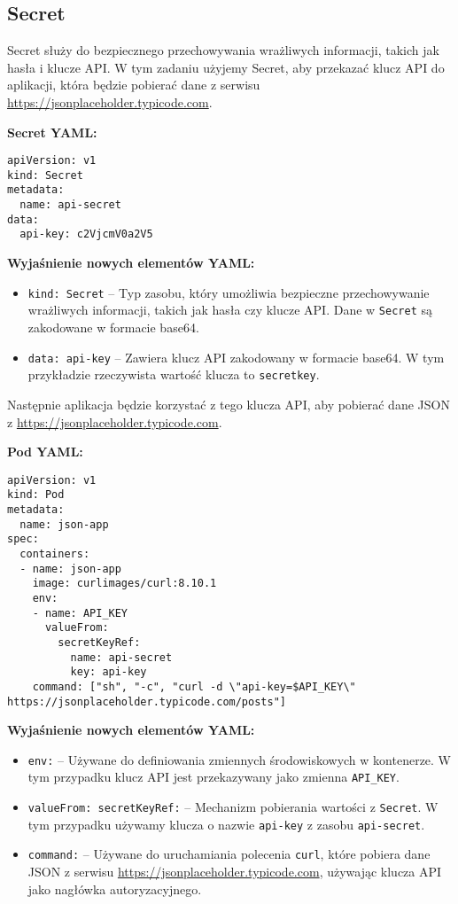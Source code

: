\documentclass{article}
\begin{document}
\subsection{Secret}

Secret służy do bezpiecznego przechowywania wrażliwych informacji, takich jak hasła i klucze API. W tym zadaniu użyjemy Secret, aby przekazać klucz API do aplikacji, która będzie pobierać dane z serwisu \url{https://jsonplaceholder.typicode.com}.

\textbf{Secret YAML:}
\begin{lstlisting}
apiVersion: v1
kind: Secret
metadata:
  name: api-secret
data:
  api-key: c2VjcmV0a2V5
\end{lstlisting}

\textbf{Wyjaśnienie nowych elementów YAML:}
\begin{itemize}
  \item \texttt{kind: Secret} – Typ zasobu, który umożliwia bezpieczne przechowywanie wrażliwych informacji, takich jak hasła czy klucze API. Dane w \texttt{Secret} są zakodowane w formacie base64.
  \item \texttt{data: api-key} – Zawiera klucz API zakodowany w formacie base64. W tym przykładzie rzeczywista wartość klucza to \texttt{secretkey}.
\end{itemize}

Następnie aplikacja będzie korzystać z tego klucza API, aby pobierać dane JSON z \url{https://jsonplaceholder.typicode.com}.

\textbf{Pod YAML:}
\begin{lstlisting}
apiVersion: v1
kind: Pod
metadata:
  name: json-app
spec:
  containers:
  - name: json-app
    image: curlimages/curl:8.10.1
    env:
    - name: API_KEY
      valueFrom:
        secretKeyRef:
          name: api-secret
          key: api-key
    command: ["sh", "-c", "curl -d \"api-key=$API_KEY\" https://jsonplaceholder.typicode.com/posts"]
\end{lstlisting}

\textbf{Wyjaśnienie nowych elementów YAML:}
\begin{itemize}
  \item \texttt{env:} – Używane do definiowania zmiennych środowiskowych w kontenerze. W tym przypadku klucz API jest przekazywany jako zmienna \texttt{API\_KEY}.
  \item \texttt{valueFrom: secretKeyRef:} – Mechanizm pobierania wartości z \texttt{Secret}. W tym przypadku używamy klucza o nazwie \texttt{api-key} z zasobu \texttt{api-secret}.
  \item \texttt{command:} – Używane do uruchamiania polecenia \texttt{curl}, które pobiera dane JSON z serwisu \url{https://jsonplaceholder.typicode.com}, używając klucza API jako nagłówka autoryzacyjnego.
\end{itemize}
\end{document}
